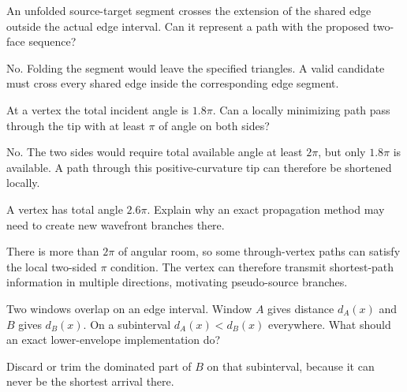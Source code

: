 \begin{problem}\label{prob:vii39-06}
An unfolded source-target segment crosses the extension of the shared edge outside the actual edge interval.  Can it represent a path with the proposed two-face sequence?
\end{problem}

\begin{solution}
No.  Folding the segment would leave the specified triangles.  A valid candidate must cross every shared edge inside the corresponding edge segment.
\end{solution}

\begin{problem}\label{prob:vii39-07}
At a vertex the total incident angle is \(1.8\pi\).  Can a locally minimizing path pass through the tip with at least \(\pi\) of angle on both sides?
\end{problem}

\begin{solution}
No.  The two sides would require total available angle at least \(2\pi\), but only \(1.8\pi\) is available.  A path through this positive-curvature tip can therefore be shortened locally.
\end{solution}

\begin{problem}\label{prob:vii39-08}
A vertex has total angle \(2.6\pi\).  Explain why an exact propagation method may need to create new wavefront branches there.
\end{problem}

\begin{solution}
There is more than \(2\pi\) of angular room, so some through-vertex paths can satisfy the local two-sided \(\pi\) condition.  The vertex can therefore transmit shortest-path information in multiple directions, motivating pseudo-source branches.
\end{solution}

\begin{problem}\label{prob:vii39-09}
Two windows overlap on an edge interval.  Window \(A\) gives distance \(d_A(x)\) and \(B\) gives \(d_B(x)\).  On a subinterval \(d_A(x)<d_B(x)\) everywhere.  What should an exact lower-envelope implementation do?
\end{problem}

\begin{solution}
Discard or trim the dominated part of \(B\) on that subinterval, because it can never be the shortest arrival there.
\end{solution}

